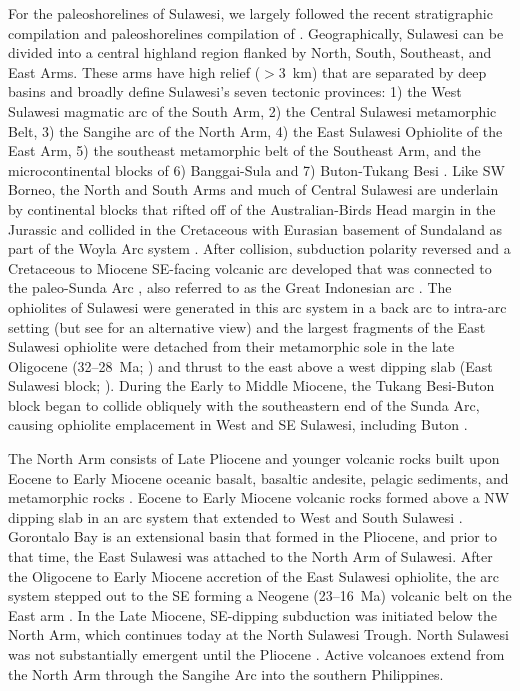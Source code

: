 \documentclass[11pt,letterpaper]{article}
\begin{document}
For the paleoshorelines of Sulawesi, we largely followed the recent stratigraphic compilation and paleoshorelines compilation of \citet{Nugraha2018a}. Geographically, Sulawesi can be divided into a central highland region flanked by North, South, Southeast, and East Arms. These arms have high relief ($>$3~km) that are separated by deep basins and broadly define Sulawesi's seven tectonic provinces: 1) the West Sulawesi magmatic arc of the South Arm, 2) the Central Sulawesi metamorphic Belt, 3) the Sangihe arc of the North Arm, 4) the East Sulawesi Ophiolite of the East Arm, 5) the southeast metamorphic belt of the Southeast Arm, and the microcontinental blocks of 6) Banggai-Sula and 7) Buton-Tukang Besi \citep{Hamilton1979a, Katili1978a}. Like SW Borneo, the North and South Arms and much of Central Sulawesi are underlain by continental blocks that rifted off of the Australian-Birds Head margin in the Jurassic and collided in the Cretaceous with Eurasian basement of Sundaland as part of the Woyla Arc system \citep{Parkinson1998b, Hennig2016a, Hall2017a, Hennig2017a}. After collision, subduction polarity reversed and a Cretaceous to Miocene SE-facing volcanic arc developed \citep{Polve1997a, Elburg1998a} that was connected to the paleo-Sunda Arc \citep{Hall2002b}, also referred to as the Great Indonesian arc \citep{Harris2006a}.  The ophiolites of Sulawesi were generated in this arc system in a back arc to intra-arc setting \citep{Monnier1995a} (but see \citealp{Kadarusman2004a} for an alternative view) and the largest fragments of the East Sulawesi ophiolite were detached from their metamorphic sole in the late Oligocene (32--28~Ma; \citealp{Parkinson1998a}) and thrust to the east above a west dipping slab (East Sulawesi block; \citealp{Villeneuve2001a}). During the Early to Middle Miocene, the Tukang Besi-Buton block began to collide obliquely with the southeastern end of the Sunda Arc, causing ophiolite emplacement in West and SE Sulawesi, including Buton \citep{Smith1991a, Bergman1996a}. 

The North Arm consists of Late Pliocene and younger volcanic rocks built upon Eocene to Early Miocene oceanic basalt, basaltic andesite, pelagic sediments, and metamorphic rocks \citep{Elburg1998a}. Eocene to Early Miocene volcanic rocks formed above a NW dipping slab in an arc system that extended to West and South Sulawesi \citep{vanLeeuwen2005a}. Gorontalo Bay is an extensional basin that formed in the Pliocene, and prior to that time, the East Sulawesi was attached to the North Arm of Sulawesi. After the Oligocene to Early Miocene accretion of the East Sulawesi ophiolite, the arc system stepped out to the SE forming a Neogene (23--16~Ma) volcanic belt on the East arm \citep{Kadarusman2004a}. In the Late Miocene, SE-dipping subduction was initiated below the North Arm, which continues today at the North Sulawesi Trough. North Sulawesi was not substantially emergent until the Pliocene \citep{vanLeeuwen2005a}. Active volcanoes extend from the North Arm through the Sangihe Arc into the southern Philippines. 
\end{document}
